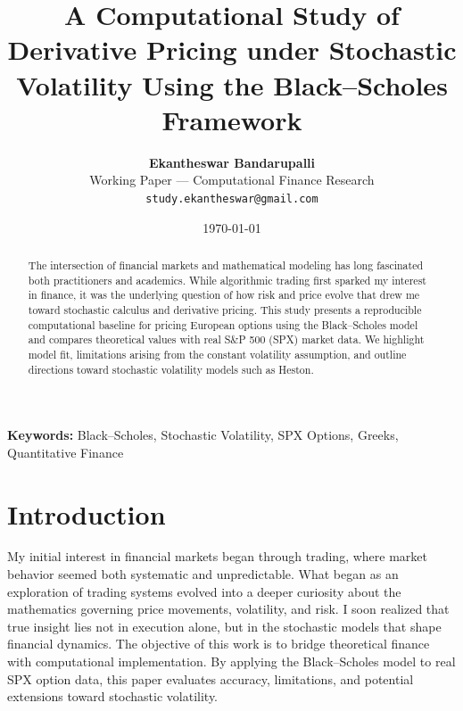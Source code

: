\documentclass[12pt]{article}
\title{\textbf{A Computational Study of Derivative Pricing under Stochastic Volatility Using the Black--Scholes Framework}}
\author{\textbf{Ekantheswar Bandarupalli}\\
\small Working Paper --- Computational Finance Research\\
\small \texttt{study.ekantheswar@gmail.com}}
\date{\today}
\begin{document}
\maketitle

\thispagestyle{empty}

\begin{abstract}
The intersection of financial markets and mathematical modeling has long fascinated both practitioners and academics.
While algorithmic trading first sparked my interest in finance, it was the underlying question of how risk and price evolve
that drew me toward stochastic calculus and derivative pricing. This study presents a reproducible computational baseline for
pricing European options using the Black--Scholes model and compares theoretical values with real S\&P 500 (SPX) market data.
We highlight model fit, limitations arising from the constant volatility assumption, and outline directions toward stochastic
volatility models such as Heston.
\end{abstract}

\textbf{Keywords:} Black--Scholes, Stochastic Volatility, SPX Options, Greeks, Quantitative Finance


\newpage
\setcounter{page}{1}

\section{Introduction}
My initial interest in financial markets began through trading, where market behavior seemed both systematic and unpredictable.
What began as an exploration of trading systems evolved into a deeper curiosity about the mathematics governing price movements,
volatility, and risk. I soon realized that true insight lies not in execution alone, but in the stochastic models that shape
financial dynamics. The objective of this work is to bridge theoretical finance with computational implementation.
By applying the Black--Scholes model to real SPX option data, this paper evaluates accuracy, limitations, and potential extensions
toward stochastic volatility.

\end{document}
